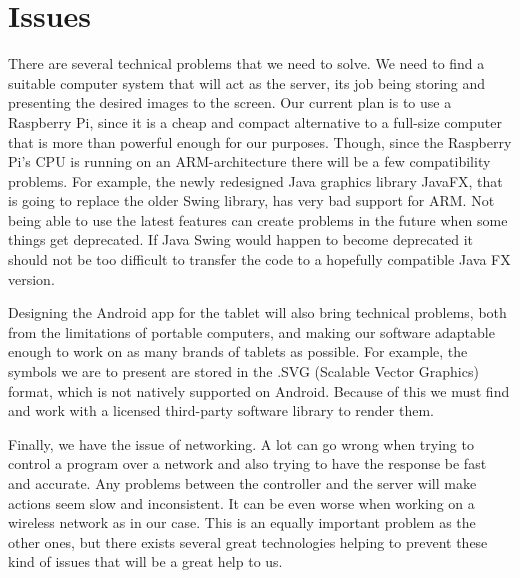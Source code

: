 \documentclass[12pt,a4paper,notitlepage]{report}
\begin{document}
\section{Issues}
There are several technical problems that we need to solve. We need to find a suitable computer system that will act as the server, its job being storing and presenting the desired images to the screen. Our current plan is to use a Raspberry Pi, since it is a cheap and compact alternative to a full-size computer that is more than powerful enough for our purposes. Though, since the Raspberry Pi's CPU is running on an ARM-architecture there will be a few compatibility problems. For example, the newly redesigned Java graphics library JavaFX, that is going to replace the older Swing library, has very bad support for ARM. Not being able to use the latest features can create problems in the future when some things get deprecated. If Java Swing would happen to become deprecated it should not be too difficult to transfer the code to a hopefully compatible Java FX version.  

Designing the Android app for the tablet will also bring technical problems, both from the limitations of portable computers, and making our software adaptable enough to work on as many brands of tablets as possible. For example, the symbols we are to present are stored in the .SVG (Scalable Vector Graphics) format, which is not natively supported on Android. Because of this we must find and work with a licensed third-party software library to render them. 

Finally, we have the issue of networking. A lot can go wrong when trying to control a program over a network and also trying to have the response be fast and accurate. Any problems between the controller and the server will make actions seem slow and inconsistent. It can be even worse when working on a wireless network as in our case. This is an equally important problem as the other ones, but there exists several great technologies helping to prevent these kind of issues that will be a great help to us. 

\end{document}
